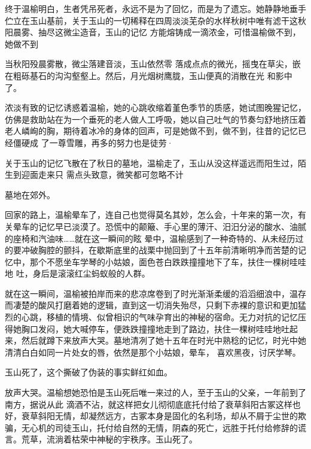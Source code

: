 \documentclass{article}
\begin{document}
终于温榆明白，生者凭吊死者，永远不是为了回忆，而是为了遗忘。她静静地垂手伫立在玉山基前，关于玉山的一切稀释在四周淡淡芜杂的水样秋树中唯有滤干这秋阳晨雾、抽尽这微尘造音，玉山的记忆
方能熔铸成一滴浓金，可惜温榆做不到，她做不到 

当秋阳殁晨雾散，微尘落建音淡，玉山依然零
\newpage
落成点点的微光，摇曳在草尖，嵌在粗砾基石的沟沟壑壑上。然后，月光烟树鹰胧，玉山便真的消散在光
和影中了。 

浓淡有致的记忆诱惑着温榆，她的心跳收缩着堇色季节的质感，她试图晚猩记忆，仿佛是救助站在为一个垂死的老人做人工呼吸，她以自己吐气的节奏匀舒地挤压着老人嶙峋的胸，期待着冰冷的身体的回声，可是她做不到，做不到，往昔的记忆已经僵硬成
了一尊雪雕，再多的努力也是徒劳· 

关于玉山的记忆飞散在了秋日的墓地，温榆走了，玉山从没这样遥远而阳生过，陌生到迎面走来只
需点头致意，微笑都可忽略不计 


墓地在郊外。 

回家的路上，温榆晕车了，连自己也觉得莫名其妙，怎么会，十年来的第一次，有关晕车的记忆早已淡漠了。恐慌中的颠簸、手心里的薄汗、汨汨分泌的酸水、油腻的座椅和汽油味……就在这一瞬间的眩
\newpage
晕中，温榆感到了一种奇特的、从未经历过的要冲破胸腔的颤抖，在歇斯底里的战栗中抛回到了十五年前清晰明净而苦楚的记忆中，那个不愿坐车学琴的小姑娘，面色苍白跌跌撞撞地下了车，扶住一棵树哇哇地
吐，身后是滚滚红尘蚂蚁般的人群。 

就在这一瞬间，温榆被拍岸而来的悲凉席卷到了时光渐渐柔缓的滔滔细浪中，温存而凄楚的酸风打磨着她的逻辑，直到这一切消失殆尽，只剩下赤裸的意识和更加猛烈的心跳，移植的情境、似曾相识的气味孕育出的神秘的宿命。无力对抗的记忆压得她胸口发闷，她大喊停车，便跌跌撞撞地走到了路边，扶住一棵树哇哇地吐起来，然后就蹲下来放声大哭。墓地清冽了她十五年在时光中熟稔的记忆，时光中她清清白白如同一片处女的唇，依然是那个小姑娘，晕车，
喜欢黑夜，讨厌学琴。 

玉山死了，这个撕破了伪装的事实鲜红如血。

放声大哭。温榆想她恐怕是玉山死后唯一来过的人，至于玉山的父亲，一年前到了南方，据说从此
\newpage
滴酒不沾，就这样把女儿彻彻底底托付给了衰草斜阳古冢这样也好，衰草斜阳无情，却凝然远方，古冢本身是固化的名利场，却从不屑于尘世的欺骗，无心机的司徒玉山，托付给自然的无情，阴森的死亡，远胜于托付给修辞的谎言。荒草，流淌着枯荣中神秘的宇秩序。玉山死了。
\end{document}
